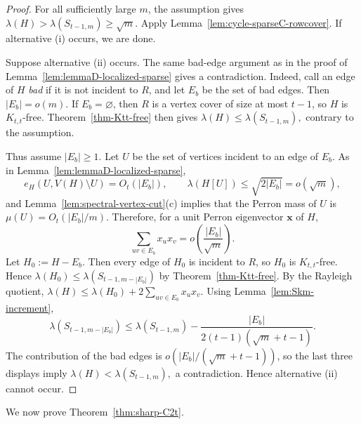 \documentclass[11pt]{article}
\theoremstyle{definition}
\theoremstyle{plain}
\begin{document}
\begin{proof}
For all sufficiently large \(m\), the assumption gives $\lambda(H)>\lambda(S_{t-1,m})\ge\sqrt m.$
Apply Lemma~\ref{lem:cycle-sparseC-rowcover}.  If alternative
\textup{(i)} occurs, we are done.

Suppose alternative \textup{(ii)} occurs.  The same bad-edge argument as
in the proof of Lemma~\ref{lem:lemmaD-localized-sparse} gives a
contradiction.  Indeed, call an edge of \(H\) \emph{bad} if it is not
incident to \(R\), and let \(E_b\) be the set of bad edges.  Then
$|E_b|=o(m).$
If \(E_b=\varnothing\), then \(R\) is a vertex cover of size at most
\(t-1\), so \(H\) is \(K_{t,t}\)-free.  Theorem~\ref{thm-Ktt-free}
then gives $\lambda(H)\le\lambda(S_{t-1,m}),$
contrary to the assumption.

Thus assume \(|E_b|\ge1\).  Let \(U\) be the set of vertices incident
to an edge of \(E_b\).  As in Lemma~\ref{lem:lemmaD-localized-sparse},
\[
        e_H(U,V(H)\setminus U)=O_t(|E_b|),
        \qquad
        \lambda(H[U])\le \sqrt{2|E_b|}=o(\sqrt m),
\]
and Lemma~\ref{lem:spectral-vertex-cut}\textup{(c)} implies that the
Perron mass of \(U\) is
$        \mu(U)=O_t(|E_b|/m).$
Therefore, for a unit Perron eigenvector \(\bm{x}\) of \(H\),
\[
        \sum_{uv\in E_b}x_ux_v
        =
        o\left(\frac{|E_b|}{\sqrt m}\right).
\]
Let \(H_0:=H-E_b\).  Then every edge of \(H_0\) is incident to \(R\), so
\(H_0\) is \(K_{t,t}\)-free.  Hence
$\lambda(H_0)\le \lambda(S_{t-1,m-|E_b|})$
by Theorem~\ref{thm-Ktt-free}.  By the Rayleigh quotient,
$\lambda(H)
        \le
        \lambda(H_0)+2\sum_{uv\in E_b}x_ux_v.$
Using Lemma~\ref{lem:Skm-increment},
\[
        \lambda(S_{t-1,m-|E_b|})
        \le
        \lambda(S_{t-1,m})
        -
        \frac{|E_b|}{2(t-1)(\sqrt m+t-1)}.
\]
The contribution of the bad edges is
\(o(|E_b|/(\sqrt m+t-1))\), so the last three displays imply $\lambda(H)<\lambda(S_{t-1,m}),$
a contradiction.  Hence alternative \textup{(ii)} cannot occur.
\end{proof}

We now prove Theorem~\ref{thm:sharp-C2t}.
\end{document}

